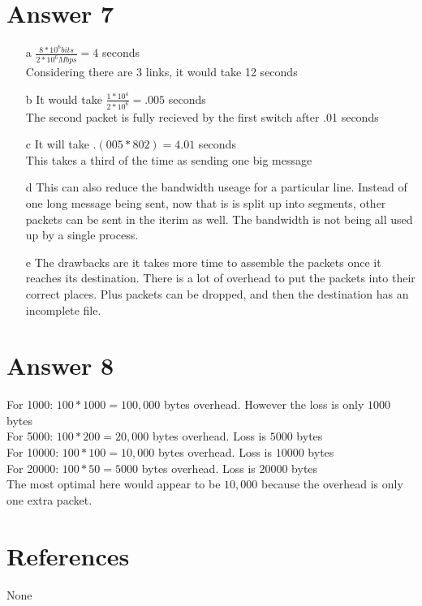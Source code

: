 \documentclass[11pt]{article}
\theoremstyle{definition}
\begin{document}
\section*{Answer 7}
\begin{enumerate}
	\item[a]
	$\frac{8*10^6 bits}{2*10^6Mbps} = 4$ seconds\\
	Considering there are 3 links, it would take 12 seconds\\

	\item[b]
	It would take $\frac{1*10^4}{2*10^6} = .005$ seconds\\
	The second packet is fully recieved by the first switch after .01 seconds\\

	\item[c]
	It will take $.(005 * 802) = 4.01$ seconds\\
	This takes a third of the time as sending one big message\\

	\item[d]
	This can also reduce the bandwidth useage for a particular line.  Instead of one long message being sent, now that is is split up into segments, other packets can be sent in the iterim as well.  The bandwidth is not being all used up by a single process.\\

	\item[e]
	The drawbacks are it takes more time to assemble the packets once it reaches its destination. There is a lot of overhead to put the packets into their correct places.  Plus packets can be dropped, and then the destination has an incomplete file.   
\end{enumerate}

\section*{Answer 8}
For 1000: $100 * 1000 = 100,000$ bytes overhead.  However the loss is only $1000$ bytes\\
For 5000: $100 * 200 = 20,000$ bytes overhead. Loss is $5000$ bytes\\
For 10000: $100 * 100 = 10,000$ bytes overhead. Loss is $10000$ bytes\\
For 20000: $100 * 50 = 5000$ bytes overhead.  Loss is $20000$ bytes\\

The most optimal here would appear to be $10,000$ because the overhead is only one extra packet.
\noindent\hrulefill


\section*{References}

None
\end{document}
